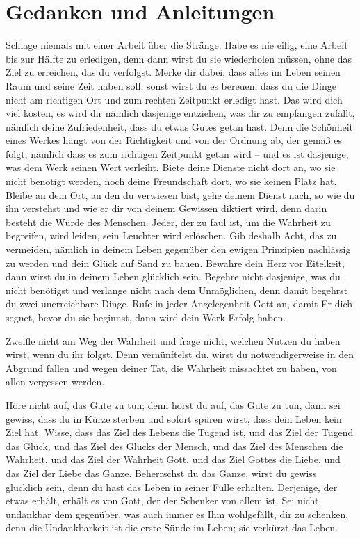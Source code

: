 	\chapter{Gedanken und Anleitungen}

Schlage niemals mit einer Arbeit über die Stränge. Habe es nie eilig, eine Arbeit bis zur Hälfte zu erledigen, denn dann wirst du sie wiederholen müssen, ohne das Ziel zu erreichen, das du verfolgst. Merke dir dabei, dass alles im Leben seinen Raum und seine Zeit haben soll, sonst wirst du es bereuen, dass du die Dinge nicht am richtigen Ort und zum rechten Zeitpunkt erledigt hast. Das wird dich viel kosten, es wird dir nämlich dasjenige entziehen, was dir zu empfangen zufällt, nämlich deine Zufriedenheit, dass du etwas Gutes getan hast. Denn die Schönheit eines Werkes hängt von der Richtigkeit und von der Ordnung ab, der gemäß es folgt, nämlich dass es zum richtigen Zeitpunkt getan wird -- und es ist dasjenige, was dem Werk seinen Wert verleiht. Biete deine Dienste nicht dort an, wo sie nicht benötigt werden, noch deine Freundschaft dort, wo sie keinen Platz hat. Bleibe an dem Ort, an den du verwiesen bist, gehe deinem Dienst nach, so wie du ihn verstehst und wie er dir von deinem Gewissen diktiert wird, denn darin besteht die Würde des Menschen. Jeder, der zu faul ist, um die Wahrheit zu begreifen, wird leiden, sein Leuchter wird erlöschen. Gib deshalb Acht, das zu vermeiden, nämlich in deinem Leben gegenüber den ewigen Prinzipien nachlässig zu werden und dein Glück auf Sand zu bauen. Bewahre dein Herz vor Eitelkeit, dann wirst du in deinem Leben glücklich sein. Begehre nicht dasjenige, was du nicht benötigst und verlange nicht nach dem Unmöglichen, denn damit begehrst du zwei unerreichbare Dinge. Rufe in jeder Angelegenheit Gott an, damit Er dich segnet, bevor du sie beginnst, dann wird dein Werk Erfolg haben.

Zweifle nicht am Weg der Wahrheit und frage nicht, welchen Nutzen du haben wirst, wenn du ihr folgst. Denn vernünftelst du, wirst du notwendigerweise in den Abgrund fallen und wegen deiner Tat, die Wahrheit missachtet zu haben, von allen vergessen werden.

Höre nicht auf, das Gute zu tun; denn hörst du auf, das Gute zu tun, dann sei gewiss, dass du in Kürze sterben und sofort spüren wirst, dass dein Leben kein Ziel hat. Wisse, dass das Ziel des Lebens die Tugend ist, und das Ziel der Tugend das Glück, und das Ziel des Glücks der Mensch, und das Ziel des Menschen die Wahrheit, und das Ziel der Wahrheit Gott, und das Ziel Gottes die Liebe, und das Ziel der Liebe das Ganze. Beherrschst du das Ganze, wirst du gewiss glücklich sein, denn du hast das Leben in seiner Fülle erhalten. Derjenige, der etwas erhält, erhält es von Gott, der der Schenker von allem ist. Sei nicht undankbar dem gegenüber, was auch immer es Ihm wohlgefällt, dir zu schenken, denn die Undankbarkeit ist die erste Sünde im Leben; sie verkürzt das Leben.

